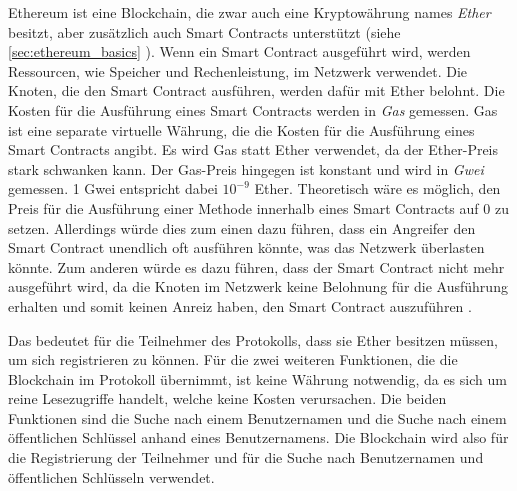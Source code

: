 Ethereum ist eine Blockchain, die zwar auch eine Kryptowährung names \textit{Ether} besitzt, aber zusätzlich auch Smart Contracts unterstützt (siehe \ref{sec:ethereum_basics} \textit{}). Wenn ein Smart Contract ausgeführt wird, werden Ressourcen, wie Speicher und Rechenleistung, im Netzwerk verwendet. Die Knoten, die den Smart Contract ausführen, werden dafür mit Ether belohnt. Die Kosten für die Ausführung eines Smart Contracts werden in \textit{Gas} gemessen. Gas ist eine separate virtuelle Währung, die die Kosten für die Ausführung eines Smart Contracts angibt. Es wird Gas statt Ether verwendet, da der Ether-Preis stark schwanken kann. Der Gas-Preis hingegen ist konstant und wird in \textit{Gwei} gemessen. 1 Gwei entspricht dabei $10^{-9}$ Ether. Theoretisch wäre es möglich, den Preis für die Ausführung einer Methode innerhalb eines Smart Contracts auf $0$ zu setzen. Allerdings würde dies zum einen dazu führen, dass ein Angreifer den Smart Contract unendlich oft ausführen könnte, was das Netzwerk überlasten könnte. Zum anderen würde es dazu führen, dass der Smart Contract nicht mehr ausgeführt wird, da die Knoten im Netzwerk keine Belohnung für die Ausführung erhalten und somit keinen Anreiz haben, den Smart Contract auszuführen \parencite[S. 105-107]{Antonopoulos_MasteringEthereum}. 

Das bedeutet für die Teilnehmer des Protokolls, dass sie Ether besitzen müssen, um sich registrieren zu können. Für die zwei weiteren Funktionen, die die Blockchain im Protokoll übernimmt, ist keine Währung notwendig, da es sich um reine Lesezugriffe handelt, welche keine Kosten verursachen. Die beiden Funktionen sind die Suche nach einem Benutzernamen und die Suche nach einem öffentlichen Schlüssel anhand eines Benutzernamens. Die Blockchain wird also für die Registrierung der Teilnehmer und für die Suche nach Benutzernamen und öffentlichen Schlüsseln verwendet.


